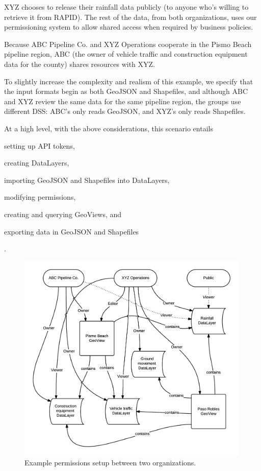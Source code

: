 XYZ chooses to release their rainfall data publicly (to anyone who's willing to retrieve it from RAPID). The rest of the data, from both organizations, uses our permissioning system to allow shared access when required by business policies.

Because ABC Pipeline Co. and XYZ Operations cooperate in the Pismo Beach pipeline region, ABC (the owner of vehicle traffic and construction equipment data for the county) shares resources with XYZ.

To slightly increase the complexity and realism of this example, we specify that the input formats begin as both GeoJSON and Shapefiles, and although ABC and XYZ review the same data for the same pipeline region, the groups use different DSS: ABC's only reads GeoJSON, and XYZ's only reads Shapefiles.

At a high level, with the above considerations, this scenario entails
\begin{enumerate*}[label=\itshape\alph*\upshape)]
\item setting up API tokens,
\item creating DataLayers,
\item importing GeoJSON and Shapefiles into DataLayers,
\item modifying permissions,
\item creating and querying GeoViews, and
\item exporting data in GeoJSON and Shapefiles
\end{enumerate*}.

\begin{figure}
    \centering
    \includegraphics[width=0.99\textwidth]{figures/permissions.png}
    \caption{Example permissions setup between two organizations.}
    \label{fig:permissions}
\end{figure}

